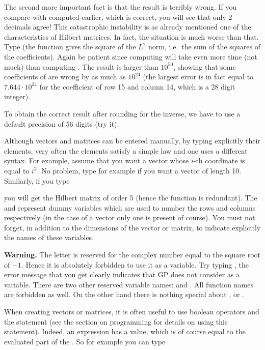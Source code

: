 The second more important fact is that the result is terribly wrong. If you
compare with  computed earlier, which is correct, you will see
that only 2 decimals agree! This catastrophic instability is as already
mentioned one of the characteristics of Hilbert matrices. In fact, the
situation is much worse than that. Type  (the
function  gives the square of the $L^2$ norm, i.e.~the sum of the
squares of the coefficients). Again be patient since computing  will
take even more time (not much) than computing . The result is
larger than $10^{50}$, showing that some coefficients of  are
wrong by as much as $10^{24}$ (the largest error is in fact equal to $7.644
\cdot 10^{24}$ for the coefficient of row 15 and column 14, which is a 28
digit integer).

To obtain the correct result after rounding for the inverse, we have to use a
default precision of 56 digits (try it).
\smallskip

Although vectors and matrices can be entered manually, by typing explicitly
their elements, very often the elements satisfy a simple law and one uses a
different syntax. For example, assume that you want a vector whose $i$-th
coordinate is equal to $i^2$. No problem, type for example
 if you want a vector of length 10. Similarly, if
you type

\centerline{}

\noindent you will get the Hilbert matrix of order 5 (hence the
 function is redundant).  The  and  represent
dummy variables which are used to number the rows and columns respectively
(in the case of a vector only one is present of course). You must not forget,
in addition to the dimensions of the vector or matrix, to indicate explicitly
the names of these variables.

{\bf Warning.} The letter  is reserved for the complex number equal to
the square root of $-1$. Hence it is absolutely forbidden to use it as a
variable. Try typing , the error message that you
get clearly indicates that GP does not consider  as a variable. There
are two other reserved variable names:  and . All function
names are forbidden as well. On the other hand there is nothing special about
,  or .

When creating vectors or matrices, it is often useful to use boolean
operators and the  statement (see the section on programming for
details on using this statement). Indeed, an  expression has a value,
which is of course equal to the evaluated part of the . So for
example you can type

